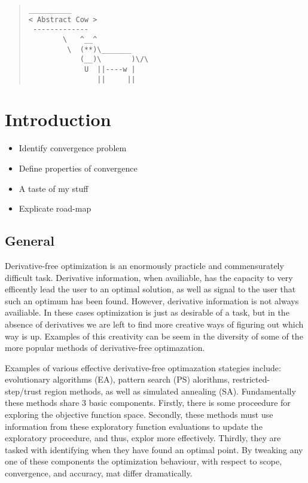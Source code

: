 \documentclass[12pt]{article}
\begin{document}


\begin{abstract}
\begin{verbatim}
__________
< Abstract Cow >
 -------------
        \   ^__^
         \  (**)\_______
            (__)\       )\/\
             U  ||----w |
                ||     ||
\end{verbatim}
\end{abstract}





\section{Introduction}
	\begin{itemize}
	\item Identify convergence problem
	\item Define properties of convergence 
	\item A taste of my stuff
	\item Explicate road-map
	\end{itemize}
	\subsection{General}
		Derivative-free optimization is an enormously practicle and commensurately difficult task.
		Derivative information, when availiable, has the capacity to very efficently lead the user to an optimal solution, as well as signal to the user that such an optimum has been found.
		However, derivative information is not always availiable.
		In these cases optimization is just as desirable of a task, but in the absence of derivatives we are left to find more creative ways of figuring out which way is up.
		Examples of this creativity can be seem in the diversity of some of the more popular methods of derivative-free optimazation.
		 
		Examples of various effective derivative-free optimazation stategies include: evolutionary algorithms (EA), pattern search (PS) alorithms, restricted-step/trust region methods, as well as simulated annealing (SA). 
		Fundamentally these methods share 3 basic components.
		Firstly, there is some proceedure for exploring the objective function space. 
		Secondly, these methods must use information from these exploratory function evaluations to update the exploratory proceedure, and thus, explor more effectively.
		Thirdly, they are tasked with identifying when they have found an optimal point.
		By tweaking any one of these components the optimization behaviour, with respect to scope, convergence, and accuracy, mat differ dramatically. 
		
\end{document}
